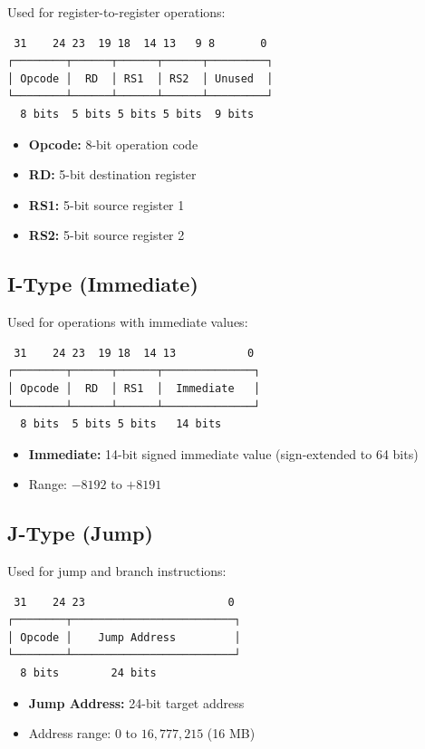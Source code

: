 \documentclass[12pt,a4paper,oneside]{book}
\begin{document}
Used for register-to-register operations:

\begin{verbatim}
 31    24 23  19 18  14 13   9 8       0
┌────────┬──────┬──────┬──────┬─────────┐
│ Opcode │  RD  │ RS1  │ RS2  │ Unused  │
└────────┴──────┴──────┴──────┴─────────┘
  8 bits  5 bits 5 bits 5 bits  9 bits
\end{verbatim}

\begin{itemize}
    \item \textbf{Opcode:} 8-bit operation code
    \item \textbf{RD:} 5-bit destination register
    \item \textbf{RS1:} 5-bit source register 1
    \item \textbf{RS2:} 5-bit source register 2
\end{itemize}

\subsection{I-Type (Immediate)}

Used for operations with immediate values:

\begin{verbatim}
 31    24 23  19 18  14 13           0
┌────────┬──────┬──────┬──────────────┐
│ Opcode │  RD  │ RS1  │  Immediate   │
└────────┴──────┴──────┴──────────────┘
  8 bits  5 bits 5 bits   14 bits
\end{verbatim}

\begin{itemize}
    \item \textbf{Immediate:} 14-bit signed immediate value (sign-extended to 64 bits)
    \item Range: $-8192$ to $+8191$
\end{itemize}

\subsection{J-Type (Jump)}

Used for jump and branch instructions:

\begin{verbatim}
 31    24 23                      0
┌────────┬─────────────────────────┐
│ Opcode │    Jump Address         │
└────────┴─────────────────────────┘
  8 bits        24 bits
\end{verbatim}

\begin{itemize}
    \item \textbf{Jump Address:} 24-bit target address
    \item Address range: $0$ to $16,777,215$ (16 MB)
\end{itemize}
\end{document}
